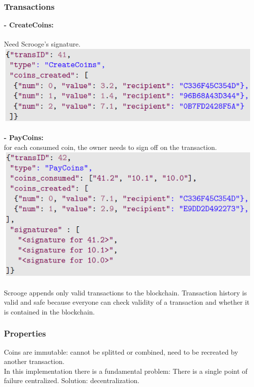 \documentclass{article}
\begin{document}
\subsubsection{Transactions}
\textbf{- CreateCoins: }\\\\
Need Scrooge's signature.\\
\includegraphics[scale=0.6]{14.png}\\\\
\textbf{- PayCoins: }\\
for each consumed coin, the owner needs to sign off on the transaction.\\
\includegraphics[scale=0.6]{15.png}\\\\
Scrooge appends only valid transactions to the blockchain. Transaction history is valid and safe because everyone can check validity of a transaction and whether it is contained in the blockchain.\\
\subsubsection{Properties}
Coins are immutable: cannot be splitted or combined, need to be recreated by another transaction.\\
In this implementation there is a fundamental problem: There is a single point of failure centralized. Solution: decentralization.\\
\end{document}
